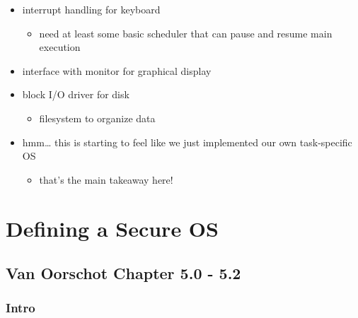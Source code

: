 \documentclass[
  12pt]{findlay}
\providecommand{\tightlist}{%
  \setlength{\itemsep}{0pt}\setlength{\parskip}{0pt}}
\begin{document}
\begin{itemize}
\tightlist
\item
  interrupt handling for keyboard

  \begin{itemize}
  \tightlist
  \item
    need at least some basic scheduler that can pause and resume main
    execution
  \end{itemize}
\item
  interface with monitor for graphical display
\item
  block I/O driver for disk

  \begin{itemize}
  \tightlist
  \item
    filesystem to organize data
  \end{itemize}
\item
  hmm\ldots{} this is starting to feel like we just implemented our own
  task-specific OS

  \begin{itemize}
  \tightlist
  \item
    that's the main takeaway here!
  \end{itemize}
\end{itemize}

\hypertarget{defining-a-secure-os}{%
\section{Defining a Secure OS}\label{defining-a-secure-os}}

\hypertarget{van-oorschot-chapter-5.0---5.2}{%
\subsection{Van Oorschot Chapter 5.0 -
5.2}\label{van-oorschot-chapter-5.0---5.2}}

\hypertarget{intro}{%
\subsubsection{Intro}\label{intro}}
\end{document}
